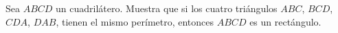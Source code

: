 Sea $ABCD$ un cuadrilátero. Muestra que si los cuatro triángulos $ABC$, $BCD$, $CDA$, $DAB$, tienen el mismo perímetro, entonces $ABCD$ es un rectángulo.